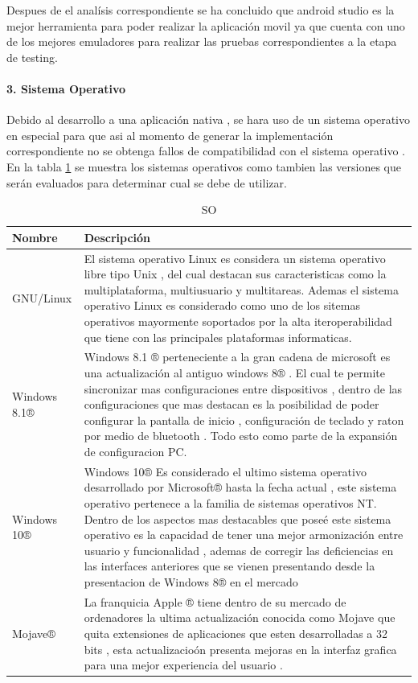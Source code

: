 Despues de el analísis correspondiente se ha concluido que android studio es la mejor herramienta para poder realizar la aplicación movil
ya que cuenta con uno de los mejores emuladores para realizar las pruebas correspondientes a la etapa de testing.

\paragraph{3. Sistema Operativo} 
Debido al desarrollo a una aplicación nativa , se hara uso de un sistema operativo en especial para que asi al momento de generar la implementación correspondiente no se obtenga fallos de compatibilidad con el sistema operativo . En la tabla \ref{disenoEstructura:SO} se muestra los sistemas operativos como tambien las versiones que serán evaluados para determinar cual se debe de utilizar.

\begin{table}[htbp]
\begin{tabular}{|p{3cm}|p{12cm}|}
\hline
\textbf{Nombre}&\textbf{Descripción}\\
\hline
\hline
GNU/Linux & El sistema operativo Linux es considera un sistema operativo libre tipo Unix , del cual destacan sus caracteristicas como la multiplataforma, multiusuario y multitareas. Ademas el sistema operativo Linux es considerado como uno de los sitemas operativos mayormente soportados por la alta iteroperabilidad que tiene con las principales plataformas informaticas.  \\
\hline
\hline
Windows 8.1® & Windows 8.1 ® perteneciente a la gran cadena de microsoft es una actualización al antiguo windows 8® . El cual te permite sincronizar mas configuraciones entre dispositivos , dentro de las configuraciones que mas destacan es la posibilidad de poder configurar la pantalla de inicio , configuración de teclado y raton por medio de bluetooth . Todo esto como parte de la expansión de configuracion PC.\\
\hline
\hline
Windows 10® & Windows 10® Es considerado el ultimo sistema operativo desarrollado por Microsoft® hasta la fecha actual , este sistema operativo pertenece a la familia de sistemas operativos NT. Dentro de los aspectos mas destacables que poseé este sistema operativo es la capacidad de tener una mejor armonización entre usuario y funcionalidad , ademas de corregir las deficiencias en las interfaces anteriores que se vienen presentando desde la presentacion de Windows 8® en el mercado   \\
\hline
\hline
Mojave® & La franquicia Apple ® tiene dentro de su mercado de ordenadores la ultima actualización conocida como Mojave que quita extensiones de aplicaciones que esten desarrolladas a 32 bits , esta actualizacioón presenta mejoras en la interfaz grafica para una mejor experiencia del usuario .  \\
\hline
\end{tabular}
\caption{SO}
\label{disenoEstructura:SO}
\end{table}


